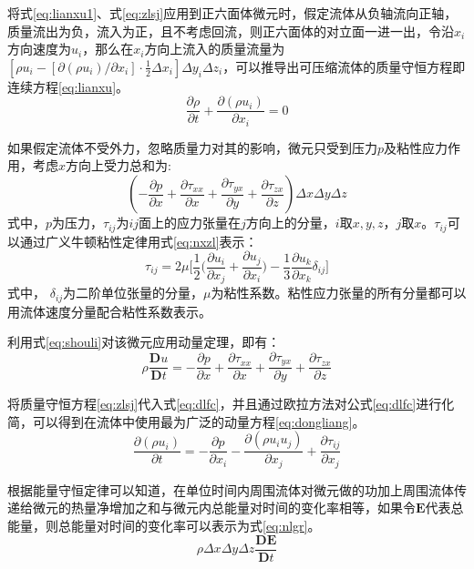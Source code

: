 将式\eqref{eq:lianxu1}、式\eqref{eq:zlsj}应用到正六面体微元时，假定流体从负轴流向正轴，质量流出为负，流入为正，且不考虑回流，则正六面体的对立面一进一出，令沿$x_i$方向速度为$u_i$，那么在$x_i$方向上流入的质量流量为$[\rho u_i-[\partial(\rho u_i)/\partial x_i]\cdot\frac{1}{2}\Delta x_i]\Delta y_i\Delta z_i$，可以推导出可压缩流体的质量守恒方程即连续方程\eqref{eq:lianxu}。
\begin{equation}
\frac{\partial\rho}{\partial t}+\frac{\partial(\rho u_i)}{\partial x_i}=0
\label{eq:lianxu}
\end{equation}

如果假定流体不受外力，忽略质量力对其的影响，微元只受到压力$p$及粘性应力作用，考虑$x$方向上受力总和为:
\begin{equation}
(-\frac{\partial p}{\partial x}+\frac{\partial\tau_{xx}}{\partial x}+\frac{\partial\tau_{yx}}{\partial y}+\frac{\partial\tau_{zx}}{\partial z})\Delta x\Delta y\Delta z
\label{eq:shouli}
\end{equation}
式中，$p$为压力，$\tau_{ij}$为$ij$面上的应力张量在$j$方向上的分量，$i$取$x,y,z$，$j$取$x$。$\tau_{ij}$可以通过广义牛顿粘性定律用式\eqref{eq:nxzl}表示：
\begin{equation}
\tau_{ij}=2\mu\Bigg[\frac{1}{2}\Big(\frac{\partial u_i}{\partial x_j}+\frac{\partial u_j}{\partial x_i}\Big)-\frac{1}{3}\frac{\partial u_k}{\partial x_k}\delta_{ij}\Bigg]
\label{eq:nxzl}
\end{equation}
式中， $\delta_{ij}$为二阶单位张量的分量，$\mu$为粘性系数。粘性应力张量的所有分量都可以用流体速度分量配合粘性系数表示。

利用式\eqref{eq:shouli}对该微元应用动量定理，即有：
\begin{equation}
\rho\frac{\mathbf{D}u}{\mathbf{D}t}=-\frac{\partial p}{\partial x}+\frac{\partial\tau_{xx}}{\partial x}+\frac{\partial\tau_{yx}}{\partial y}+\frac{\partial\tau_{zx}}{\partial z}
\label{eq:dlfc}
\end{equation}

将质量守恒方程\eqref{eq:zlsj}代入式\eqref{eq:dlfc}，并且通过欧拉方法对公式\eqref{eq:dlfc}进行化简，可以得到在流体中使用最为广泛的动量方程\eqref{eq:dongliang}。
\begin{equation}
\frac{\partial(\rho u_i)}{\partial t}=-\frac{\partial p}{\partial x_i}-\frac{\partial(\rho u_iu_j)}{\partial x_j}+\frac{\partial \tau_{ij}}{\partial x_j}\label{eq:dongliang}
\end{equation}

根据能量守恒定律可以知道，在单位时间内周围流体对微元做的功加上周围流体传递给微元的热量净增加之和与微元内总能量对时间的变化率相等，如果令$\mathbf{E}$代表总能量，则总能量对时间的变化率可以表示为式\eqref{eq:nlgr}。
\begin{equation}
\rho\Delta x\Delta y\Delta z\frac{\mathbf{DE}}{\mathbf{D}t}
\label{eq:nlgr}
\end{equation}

